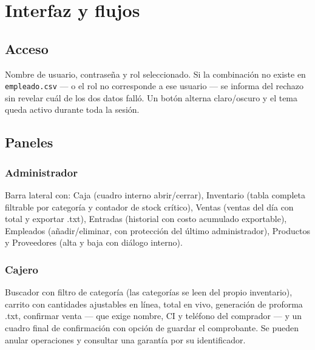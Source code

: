 \chapter{Interfaz y flujos}

\section{Acceso}

Nombre de usuario, contraseña y rol seleccionado. Si la combinación no existe en \texttt{empleado.csv} — o el rol no corresponde a ese usuario — se informa del rechazo sin revelar cuál de los dos datos falló. Un botón alterna claro/oscuro y el tema queda activo durante toda la sesión.

\section{Paneles}
\subsection{Administrador}

Barra lateral con: Caja (cuadro interno abrir/cerrar), Inventario (tabla completa filtrable por categoría y contador de stock crítico), Ventas (ventas del día con total y exportar .txt), Entradas (historial con costo acumulado exportable), Empleados (añadir/eliminar, con protección del último administrador), Productos y Proveedores (alta y baja con diálogo interno).

\subsection{Cajero}

Buscador con filtro de categoría (las categorías se leen del propio inventario), carrito con cantidades ajustables en línea, total en vivo, generación de proforma .txt, confirmar venta — que exige nombre, CI y teléfono del comprador — y un cuadro final de confirmación con opción de guardar el comprobante. Se pueden anular operaciones y consultar una garantía por su identificador.

